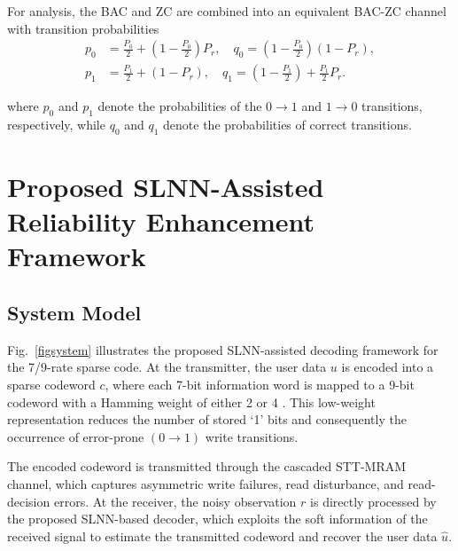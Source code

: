 \documentclass[conference]{IEEEtran}
\begin{document}

For analysis, the BAC and ZC are combined into an equivalent BAC-ZC channel with transition probabilities
%
\begin{equation}
\begin{aligned}
p_0 &= \frac{P_0}{2} + \left(1 - \frac{P_0}{2}\right) P_r, \quad
q_0 = \left(1 - \frac{P_0}{2}\right)(1 - P_r), \\
p_1 &= \frac{P_1}{2} + (1 - P_r), \quad
q_1 = \left(1 - \frac{P_1}{2}\right) + \frac{P_1}{2} P_r.
\end{aligned}
\end{equation}

where $p_0$ and $p_1$ denote the probabilities of the $0\rightarrow 1$ and $1\rightarrow 0$ transitions, respectively, while $q_0$ and $q_1$ denote the probabilities of correct transitions.

\section{Proposed SLNN-Assisted Reliability Enhancement Framework}
\label{section_design}

\subsection{System Model}
Fig.~\ref{figsystem} illustrates the proposed SLNN-assisted decoding framework for the 7/9-rate sparse code. At the transmitter, the user data $u$ is encoded into a sparse codeword $c$, where each 7-bit information word is mapped to a 9-bit codeword with a Hamming weight of either 2 or 4 \cite{nguyen2021design}. This low-weight representation reduces the number of stored `1' bits and consequently the occurrence of error-prone $(0 \rightarrow 1)$ write transitions.

The encoded codeword is transmitted through the cascaded STT-MRAM channel, which captures asymmetric write failures, read disturbance, and read-decision errors. At the receiver, the noisy observation $r$ is directly processed by the proposed SLNN-based decoder, which exploits the soft information of the received signal to estimate the transmitted codeword and recover the user data $\hat{u}$.
\end{document}
